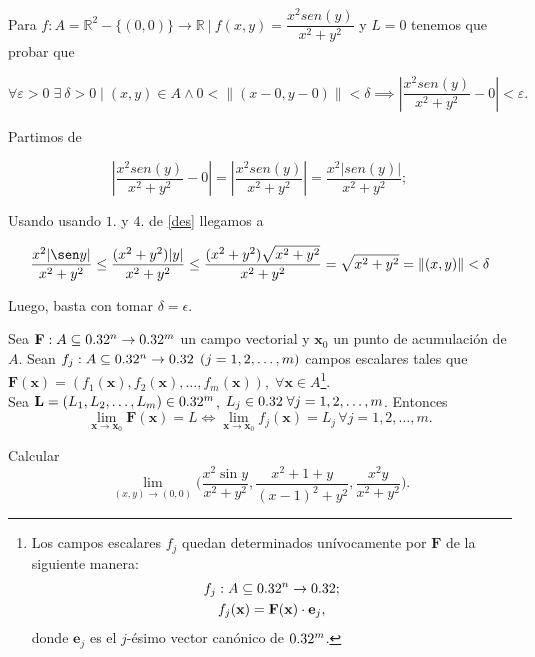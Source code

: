 Para $f: A=\mathbb{R}^{2}-\{(0,0)\} \to \mathbb{R} \: | \: f(x,y)=\dfrac{x^2sen(y)}{x^2+y^2}$  \: y \: $L=0$ tenemos que probar que

\[
\forall \varepsilon > 0\; \exists\:\delta > 0 \;|\;    (x,y) \in A \land 0 < \|(x-0,y-0)\| < \delta \implies   \left| \dfrac{x^2sen(y)}{x^2+y^2}- 0\right|  <  \varepsilon.   
\]

Partimos de

\[
| \frac{x^2sen(y)}{x^2+y^2} - 0|=| \frac{x^2sen(y)}{x^2+y^2}|= \frac{x^2|sen(y)|}{x^2+y^2};
\]

Usando usando  $1.$ y $4.$ de \ref{des} llegamos a 

\[
\frac{x^2|\sen y|}{x^2+y^2}\leq\frac{(x^2+y^2)|y| }{x^2+y^2}\leq\frac{(x^2+y^2)\sqrt{x^2+y^2} }{x^2+y^2}=\sqrt{x^2+y^2}=\|(x,y)\|<\delta
\]

Luego, basta con tomar $\delta=\epsilon$.





\begin{propertie} \label{prop:lim_x_comp}
 Sea $\mathbf{F}: A  \subseteq  0.32^n \to 0.32^m$ un campo vectorial y $\mathbf{x}_0$ un punto de acumulaci\'on de $A$. Sean $f_j: A  \subseteq  0.32^n \to 0.32 \,\;(j = 1,2, \dots, m)$ campos escalares tales que $\mathbf{F}(\mathbf{x}) = \left( f_1(\mathbf{x}), f_2(\mathbf{x}), \dots, f_m(\mathbf{x}) \right),\; \forall \mathbf{x} \in A$\footnote{Los campos escalares $f_j$ quedan determinados un\'ivocamente por $\mathbf{F}$ de la siguiente manera: 
 \begin{gather*}
     f_j : A  \subseteq  0.32^n \to 0.32; \\
     f_j(\mathbf{x}) = \mathbf{F}(\mathbf{x}) \cdot \mathbf{e}_j,
 \end{gather*} donde $\mathbf{e}_j$ es el $j$-\'esimo vector can\'onico de $0.32^m$.}.\\
 Sea $\mathbf{L} = \left( L_1, L_2, \dots, L_m \right) \in 0.32^m$, $L_j \in 0.32 \; \forall j = 1,2, \dots, m$. Entonces
 \[
  \lim_{\mathbf{x} \to \mathbf{x}_0} \mathbf{F}(\mathbf{x}) = L \iff \lim_{\mathbf{x} \to \mathbf{x}_0} f_j(\mathbf{x}) = L_j \, \forall j = 1,2, \dots, m.
 \]
\end{propertie}

\begin{tarea}Calcular
 \[
  \lim_{(x,y) \to (0,0)}   \Big( \frac{x^2 \sin y}{x^2 + y^2},  \frac{x^2 +1 +  y}{(x-1)^2 +  y^2}, \frac{x^2  y}{x^2 + y^2}   \Big).
 \]
\end{tarea}

